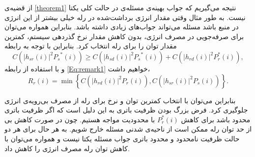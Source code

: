 \begin{remark}
از قضیه‌ی
\ref{theorem1}
نتیجه می‌گیریم که جواب بهینه‌ی مسئله‌ی
در حالت کلی یکتا نیست. به طور مثال وقتی مقدار انرژی برداشت‌شده در رله خیلی بیشتر از این انرژی در منبع باشد مسئله می‌تواند جواب‌های زیادی داشته باشد. بنابراین همواره می‌توان برای صرفه‌جویی در مصرف انرژی، بدون کاهش مقدار نرخ گذردهی سیستم، کمترین مقدار توان را برای رله انتخاب کرد. بنابراین با توجه به رابطه
\begin{equation}
C\left( {{{\left| {{h_{sr}}\left( i \right)} \right|}^2}{P_s}^*\left( i \right)} \right) 
\ge C\left( {{{\left| {{h_{sd}}\left( i \right)} \right|}^2}{P_s}^*\left( i \right)} \right) + C\left( {{{\left| {{h_{rd}}\left( {i} \right)} \right|}^2}P_r^*\left( {i} \right)} \right),
\label{Eq:remark1}
\end{equation}
و با  استفاده از رابطه
\ref{Eq:remark1}
خواهیم داشت،
\begin{equation}
{R_r}(i) = \min \left\{ {C\left( {{{\left| {{h_{rd}}(i)} \right|}^2}{P_r}(i)} \right),C\left( {{{\left| {{h_{sr}}(i)} \right|}^2}{P_s}(i)} \right)} \right\}.
\end{equation}

بنابراین می‌توان با انتخاب کمترین توان و نرخ برای رله از مصرف بی‌رویه‌ی انرژی جلوگیری کرد. فرض بزرگ بودن ظرفیت باتری‌ به این دلیل است که اگر ظرفیت باتری محدود باشد برای کاهش
$P_r^*(i)$
با محدودیت مواجه هستیم. چون در صورت کاهش بی از حد توان رله ممکن است از ناحیه‌ی شدنی مسئله خارج شویم. به هر حال برای هر دو حالت ظرفیت نامحدود و محدود باتری جواب مسئله یکتا نیست و همواره می‌توان با کاهش توان رله مصرف انرژی را کاهش داد.
\end{remark}




